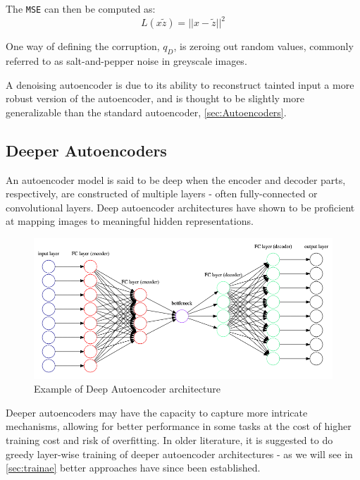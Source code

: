 The \texttt{MSE} can then be computed as:
$$
L(x\widetilde{z}) = ||x-\widetilde{z}||^{2}
$$

One way of defining the corruption, $q_{D}$, is zeroing out random values\autocite{Vincent2008}, commonly referred to as salt-and-pepper noise in greyscale images.

A denoising autoencoder is due to its ability to reconstruct tainted input a more robust version of the autoencoder, and is thought to be slightly more generalizable than the standard autoencoder, \autoref{sec:Autoencoders}.

\subsection{Deeper Autoencoders}
An autoencoder model is said to be deep when the encoder and decoder parts, respectively, are constructed of multiple layers - often fully-connected or convolutional layers. 
Deep autoencoder architectures have shown to be proficient at mapping images to meaningful hidden representations\autocite{Krizhevsky2010}. 

\begin{figure}[H]
    \centering
    \includegraphics[scale=0.4]{pictures/graphviz/autoencoder_deep}
    \caption{Example of Deep Autoencoder architecture}
    \label{fig:deepautoencoder}
\end{figure}

Deeper autoencoders may have the capacity to capture more intricate mechanisms, allowing for better performance in some tasks at the cost of higher training cost and risk of overfitting. 
In older literature, it is suggested to do greedy layer-wise training of deeper autoencoder architectures - as we will see in \autoref{sec:trainae} better approaches have since been established.
\newline



